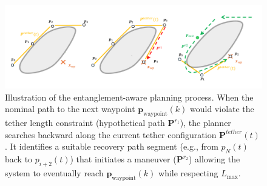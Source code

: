 \begin{figure}[t] %
    \centering
    \includegraphics[width=\textwidth]{EA-Planner/figures/planner.pdf} %
    \caption{Illustration of the entanglement-aware planning process. When the nominal path to the next waypoint \( \mathbf{p}_{\text{waypoint}}(k) \) would violate the tether length constraint (hypothetical path \( \mathbf{P}^{r_1} \)), the planner searches backward along the current tether configuration \( \mathbf{P}^{tether}(t) \). It identifies a suitable recovery path segment (e.g., from \( p_N(t) \) back to \( p_{i+2}(t) \)) that initiates a maneuver (\( \mathbf{P}^{r_2} \)) allowing the system to eventually reach \( \mathbf{p}_{\text{waypoint}}(k) \) while respecting \( L_{\text{max}} \).}
    \label{fig:planner}
\end{figure}



